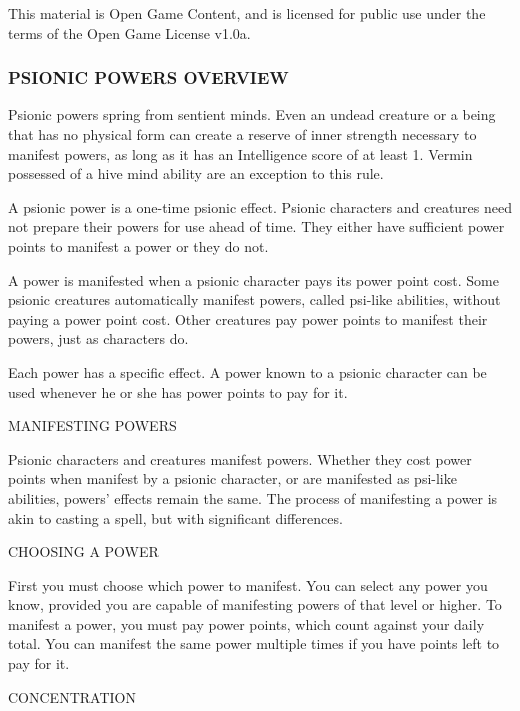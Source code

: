 \documentclass{article}
\begin{document}
This material is Open Game Content, and is licensed for public use under the terms 
of the Open Game License v1.0a.

\subsubsection*{{\LARGE{}PSIONIC POWERS OVERVIEW}}

\vspace{12pt}
Psionic powers spring from sentient minds. Even an undead creature or a being that 
has no physical form can create a reserve of inner strength necessary to manifest 
powers, as long as it has an Intelligence score of at least 1. Vermin possessed 
of a hive mind ability are an exception to this rule.

A psionic power is a one-time psionic effect. Psionic characters and creatures 
need not prepare their powers for use ahead of time. They either have sufficient 
power points to manifest a power or they do not.

A power is manifested when a psionic character pays its power point cost. Some 
psionic creatures automatically manifest powers, called psi-like abilities, without 
paying a power point cost. Other creatures pay power points to manifest their powers, 
just as characters do.

\vspace{12pt}
Each power has a specific effect. A power known to a psionic character can be used 
whenever he or she has power points to pay for it.

\vspace{12pt}
MANIFESTING POWERS

Psionic characters and creatures manifest powers. Whether they cost power points 
when manifest by a psionic character, or are manifested as psi-like abilities, 
powers' effects remain the same. The process of manifesting a power is akin to 
casting a spell, but with significant differences.

\vspace{12pt}
CHOOSING A POWER

First you must choose which power to manifest. You can select any power you know, 
provided you are capable of manifesting powers of that level or higher. To manifest 
a power, you must pay power points, which count against your daily total. You can 
manifest the same power multiple times if you have points left to pay for it.

\vspace{12pt}
CONCENTRATION
\end{document}
